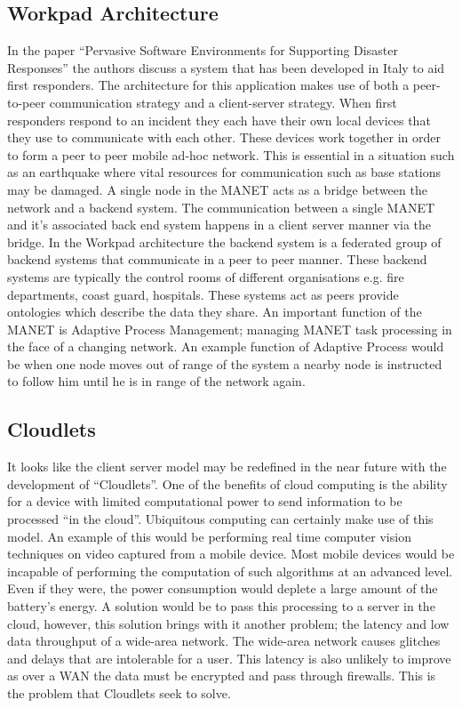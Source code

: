 \documentclass[11pt]{amsart}
\begin{document}
\subsection{Workpad Architecture}

In the paper ``Pervasive Software Environments for Supporting Disaster Responses'' the authors discuss a system that has been developed in Italy to aid first responders. The architecture for this application makes use of both a peer-to-peer communication strategy and a client-server strategy. When first responders respond to an incident they each have their own local devices that they use to communicate with each other. These devices work together in order to form a peer to peer mobile ad-hoc network. This is essential in a situation such as an earthquake where vital resources for communication such as base stations may be damaged. A single node in the MANET acts as a bridge between the network and a backend system. The communication between a single MANET and it's associated back end system happens in a client server manner via the bridge. In the Workpad architecture the backend system is a federated group of backend systems that communicate in a peer to peer manner. These backend systems are typically the control rooms of different organisations e.g. fire departments, coast guard, hospitals. These systems act as peers provide ontologies which describe the data they share. An important function of the MANET is Adaptive Process Management; managing MANET task processing in the face of a changing network. An example function of Adaptive Process would be when one node moves out of range of the system a nearby node is instructed to follow him until he is in range of the network again.

\subsection{Cloudlets}

It looks like the client server model may be redefined in the near future with the development of ``Cloudlets''. One of the benefits of cloud computing is the ability for a device with limited computational power to send information to be processed  ``in the cloud''. Ubiquitous computing can certainly make use of this model. An example of this would be performing real time computer vision techniques on video captured from a mobile device. Most mobile devices would be incapable of performing the computation of such algorithms at an advanced level. Even if they were, the power consumption would deplete a large amount of the battery's energy. A solution would be to pass this processing to a server in the cloud, however, this solution brings with it another problem; the latency and low data throughput of a wide-area network. The wide-area network causes glitches and delays that are intolerable for a user. This latency is also unlikely to improve as over a WAN the data must be encrypted and pass through firewalls. This is the problem that Cloudlets seek to solve. 
\end{document}
